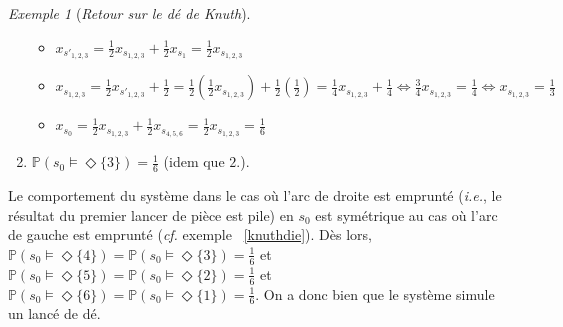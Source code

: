\documentclass[12pt,a4paper]{report}
\theoremstyle{definition}%
\theoremstyle{remark}
\newtheorem{example}{Exemple}[chapter]
\newcommand{\ie}{\textit{i.e.}, }
\newcommand{\cf}{\textit{cf.} }
\begin{document}
\begin{example}[\textit{Retour sur le dé de Knuth}]
\begin{spacing}{1.5}
\begin{enumerate}
\begin{itemize}
			\item $x_{s'_{1, 2, 3}} = \frac{1}{2} x_{s_{1, 2, 3}} + \frac{1}{2} x_{s_1} = \frac{1}{2} x_{s_{1, 2, 3}}$
			\item $x_{s_{1, 2, 3}} = \frac{1}{2} x_{s'_{1, 2, 3}} + \frac{1}{2}  = 
			\frac{1}{2} (\frac{1}{2} x_{s_{1, 2, 3}}) +\frac{1}{2} (\frac{1}{2})
			= \frac{1}{4} x_{s_{1, 2, 3}} +\frac{1}{4}
			\Leftrightarrow \frac{3}{4} x_{s_{1, 2, 3}} = \frac{1}{4}
			\Leftrightarrow x_{s_{1, 2, 3}} = \frac{1}{3}$
			\item $x_{s_0} = \frac{1}{2} x_{s_{1,2,3}} + \frac{1}{2} x_{s_{4, 5, 6}} = \frac{1}{2} x_{s_{1,2,3}} = \frac{1}{6}$
		\end{itemize}
		\item $\mathbb{P}(s_0 \models \Diamond \{3\}) = \frac{1}{6}$ (idem que $2.$).
	\end{enumerate}\end{spacing}
	Le comportement du système dans le cas où l'arc de droite est emprunté (\ie le résultat du premier lancer de pièce est pile) en $s_0$ est symétrique au cas où l'arc de gauche est emprunté (\cf exemple  ~\ref{knuthdie}). Dès lors, $\mathbb{P}(s_0 \models \Diamond \{4\}) = \mathbb{P}(s_0 \models \Diamond \{3\}) = \frac{1}{6}$ et $\mathbb{P}(s_0 \models \Diamond \{5\}) = \mathbb{P}(s_0 \models \Diamond \{2\}) = \frac{1}{6}$ et $\mathbb{P}(s_0 \models \Diamond \{6\}) = \mathbb{P}(s_0 \models \Diamond \{1\}) = \frac{1}{6}$. On a donc bien que le système simule un lancé de dé.
	
\end{example}
\end{document}
